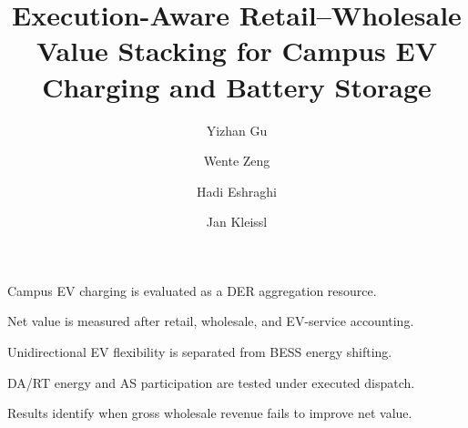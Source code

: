\documentclass[final,5p,times]{elsarticle}
\begin{document}
\begin{frontmatter}

\title{Execution-Aware Retail--Wholesale Value Stacking for Campus EV Charging and Battery Storage}

\author[ucsd]{Yizhan Gu}
\author[totalenergies]{Wente Zeng}
\author[totalenergies]{Hadi Eshraghi}
\author[ucsd]{Jan Kleissl}



\begin{highlights}
\item Campus EV charging is evaluated as a DER aggregation resource.
\item Net value is measured after retail, wholesale, and EV-service accounting.
\item Unidirectional EV flexibility is separated from BESS energy shifting.
\item DA/RT energy and AS participation are tested under executed dispatch.
\item Results identify when gross wholesale revenue fails to improve net value.
\end{highlights}


\end{frontmatter}
\end{document}
